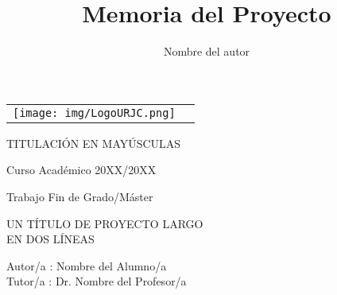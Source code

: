 \documentclass[a4paper, 12pt]{book}
\title{Memoria del Proyecto}
\author{Nombre del autor}
\begin{document}
 


\begin{titlepage}
\begin{center}
\begin{tabular}[c]{c c}
\texttt{[image: img/LogoURJC.png]}
\\
\end{tabular}

\vspace{3cm}

\Large 
TITULACIÓN EN MAYÚSCULAS

\vspace{0.4cm}

\large
Curso Académico 20XX/20XX

\vspace{0.8cm}

Trabajo Fin de Grado/Máster

\vspace{2cm}

\LARGE UN TÍTULO DE PROYECTO LARGO\\
EN DOS LÍNEAS
\vspace{3cm}

\large
Autor/a : Nombre del Alumno/a \\
Tutor/a : Dr. Nombre del Profesor/a
\end{center}
\end{titlepage}

\newpage
\mbox{}
\thispagestyle{empty} %


\clearpage
{}
\chapter*{}
\end{document}
